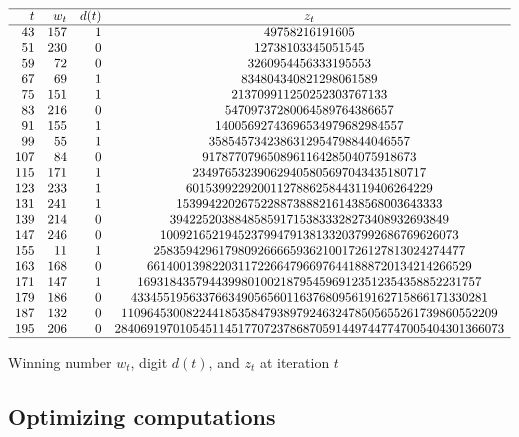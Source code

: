\documentclass[oneside,10pt]{book}
\renewcommand{\arraystretch}{1.4} %
\begin{document}
\begin{table}%
\small
\setlength\extrarowheight{-2pt}
\[
\begin{array}{rrrc}
\hline
t	&  w_t & d(t) & z_t\\ 
\hline
  43 &  157 &  1 & 49758216191605 \\
  51 &  230 &  0 & 12738103345051545 \\
  59 &   72 &  0 & 3260954456333195553 \\
  67 &   69 &  1 & 834804340821298061589 \\
  75 &  151 &  1 & 213709911250252303767133 \\
  83 &  216 &  0 & 54709737280064589764386657 \\
  91 &  155 &  1 & 14005692743696534979682984557 \\
  99 &   55 &  1 & 3585457342386312954798844046557 \\
 107 &   84 &  0 & 917877079650896116428504075918673 \\
 115 &  171 &  1 & 234976532390629405805697043435180717 \\
 123 &  233 &  1 & 60153992292001127886258443119406264229 \\
 131 &  241 &  1 & 15399422026752288738882161438568003643333 \\
 139 &  214 &  0 & 3942252038848585917153833328273408932693849 \\
 147 &  246 &  0 & 1009216521945237994791381332037992686769626073 \\
 155 &   11 &  1 & 258359429617980926666593621001726127813024274477 \\
 163 &  168 &  0 & 66140013982203117226647966976441888720134214266529 \\
 171 &  147 &  1 & 16931843579443998010021879545969123512354358852231757 \\
 179 &  186 &  0 & 4334551956337663490565601163768095619162715866171330281 \\
 187 &  132 &  0 & 1109645300822441853584793897924632478505655261739860552209 \\
 195 &  206 &  0 & 284069197010545114517707237868705914497447747005404301366073 \\
\hline
\end{array}
\]
\caption{\label{tabtres} Winning number $w_t$, digit $d(t)$, and $z_t$ at iteration $t$}
\end{table}
\renewcommand{\arraystretch}{1.0} %


\subsection{Optimizing computations}\label{puosaw}
\end{document}
